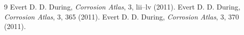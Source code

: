 \documentclass[12pt,a4paper]{article}
\begin{document}
\begin{thebibliography}{9}
     Evert D. D. During, \textit{Corrosion Atlas}, 3, lii--lv (2011).
     Evert D. D. During, \textit{Corrosion Atlas}, 3, 365 (2011).
     Evert D. D. During, \textit{Corrosion Atlas}, 3, 370 (2011).
    
\end{thebibliography}
\end{document}
